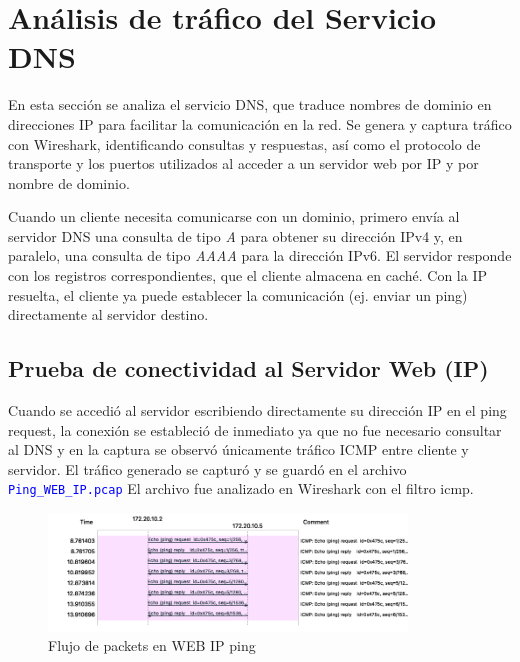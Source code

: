 \documentclass[10pt]{article}
\begin{document}
\renewcommand{\thesection}{8.\arabic{section}}
\section{Análisis de tráfico del Servicio DNS}

En esta sección se analiza el servicio DNS, que traduce nombres de dominio en direcciones IP para facilitar la comunicación en la red. Se genera y captura tráfico con Wireshark, identificando consultas y respuestas, así como el protocolo de transporte y los puertos utilizados al acceder a un servidor web por IP y por nombre de dominio.


Cuando un cliente necesita comunicarse con un dominio, primero envía al servidor DNS una consulta de tipo \textit{A} para obtener su dirección IPv4 y, en paralelo, una consulta de tipo \textit{AAAA} para la dirección IPv6. El servidor responde con los registros correspondientes, que el cliente almacena en caché. Con la IP resuelta, el cliente ya puede establecer la comunicación (ej. enviar un ping) directamente al servidor destino.  

\subsection{Prueba de conectividad al Servidor Web (IP)}
Cuando se accedió al servidor escribiendo directamente su dirección IP en el ping request, la conexión se estableció de inmediato ya que no fue necesario consultar al DNS y en la captura se observó únicamente tráfico ICMP entre cliente y servidor. El tráfico generado se capturó y se guardó en el archivo \textcolor{blue}{\texttt{Ping\_WEB\_IP.pcap}} El archivo fue analizado en Wireshark con el filtro icmp.

\begin{figure}[H]
    \centering
    \includegraphics[width=0.85\textwidth]{lab-02-screenshots/8.2-WEB-IP-flow}
    \caption{Flujo de packets en WEB IP ping}
\end{figure}
\end{document}
